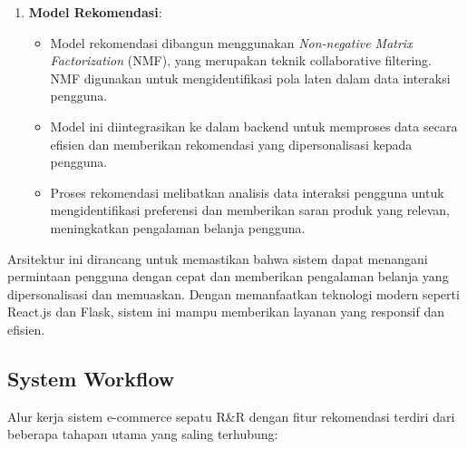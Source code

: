 \documentclass[journal,article,submit,pdftex,moreauthors]{Definitions/mdpi}
\begin{document}
\begin{enumerate}
    \item \textbf{Model Rekomendasi}:
    \begin{itemize}
        \item Model rekomendasi dibangun menggunakan \textit{Non-negative Matrix Factorization} (NMF), yang merupakan teknik collaborative filtering. NMF digunakan untuk mengidentifikasi pola laten dalam data interaksi pengguna.
        \item Model ini diintegrasikan ke dalam backend untuk memproses data secara efisien dan memberikan rekomendasi yang dipersonalisasi kepada pengguna.
        \item Proses rekomendasi melibatkan analisis data interaksi pengguna untuk mengidentifikasi preferensi dan memberikan saran produk yang relevan, meningkatkan pengalaman belanja pengguna.
    \end{itemize}
\end{enumerate}

Arsitektur ini dirancang untuk memastikan bahwa sistem dapat menangani permintaan pengguna dengan cepat dan memberikan pengalaman belanja yang dipersonalisasi dan memuaskan. Dengan memanfaatkan teknologi modern seperti React.js dan Flask, sistem ini mampu memberikan layanan yang responsif dan efisien.

\subsection{System Workflow}
Alur kerja sistem e-commerce sepatu R\&R dengan fitur rekomendasi terdiri dari beberapa tahapan utama yang saling terhubung:
\end{document}
